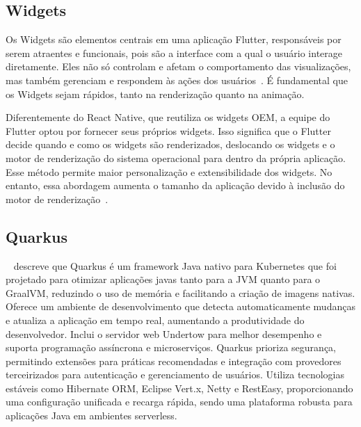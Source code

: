 \subsection{Widgets}\label{subsec: widgets}
Os Widgets são elementos centrais em uma aplicação Flutter, responsáveis por serem atraentes e funcionais, pois são a interface com a qual o usuário interage diretamente.
Eles não só controlam e afetam o comportamento das visualizações, mas também gerenciam e respondem às ações dos usuários~\cite{faust2020using}.
É fundamental que os Widgets sejam rápidos, tanto na renderização quanto na animação.

Diferentemente do React Native, que reutiliza os widgets OEM, a equipe do Flutter optou por fornecer seus próprios widgets.
Isso significa que o Flutter decide quando e como os widgets são renderizados, deslocando os widgets e o motor de renderização do sistema operacional para dentro da própria aplicação.
Esse método permite maior personalização e extensibilidade dos widgets.
No entanto, essa abordagem aumenta o tamanho da aplicação devido à inclusão do motor de renderização~\cite{flutter}.

\subsection{Quarkus}\label{subsec: quarkus}
~\cite{vsipek2020enhancing} descreve que Quarkus é um framework Java nativo para Kubernetes que foi projetado para otimizar aplicações javas tanto para a JVM quanto para o GraalVM, reduzindo o uso de memória e facilitando a criação de imagens nativas.
Oferece um ambiente de desenvolvimento que detecta automaticamente mudanças e atualiza a aplicação em tempo real, aumentando a produtividade do desenvolvedor.
Inclui o servidor web Undertow para melhor desempenho e suporta programação assíncrona e microserviços.
Quarkus prioriza segurança, permitindo extensões para práticas recomendadas e integração com provedores terceirizados para autenticação e gerenciamento de usuários.
Utiliza tecnologias estáveis como Hibernate ORM, Eclipse Vert.x, Netty e RestEasy, proporcionando uma configuração unificada e recarga rápida, sendo uma plataforma robusta para aplicações Java em ambientes serverless.







